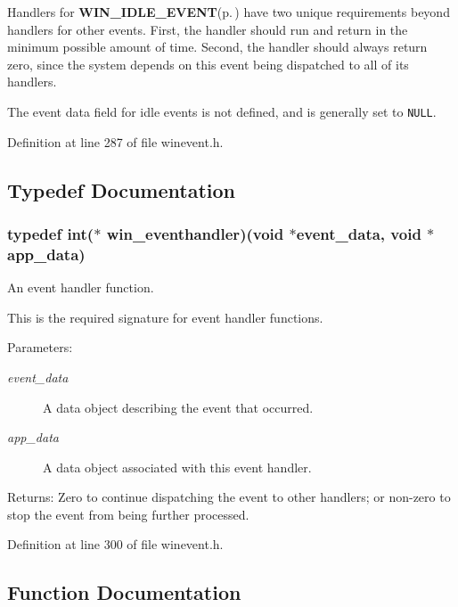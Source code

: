 Handlers for {\bf WIN\_\-IDLE\_\-EVENT}{\rm (p.\,\pageref{winevent_8h_a0})} have two unique requirements beyond handlers for other events. First, the handler should run and return in the minimum possible amount of time. Second, the handler should always return zero, since the system depends on this event being dispatched to all of its handlers.

The event data field for idle events is not defined, and is generally set to {\tt NULL}. 

Definition at line 287 of file winevent.h.

\subsection{Typedef Documentation}
\subsubsection{\setlength{\rightskip}{0pt plus 5cm}typedef int($\ast$ {\bf win\_\-eventhandler})(void $\ast$event\_\-data, void $\ast$app\_\-data)}\label{winevent_8h_a1}


An event handler function. 

This is the required signature for event handler functions.

\begin{Desc}
\item[Parameters:]
\begin{description}
\item[{\em event\_\-data}]A data object describing the event that occurred. \item[{\em app\_\-data}]A data object associated with this event handler.\end{description}
\end{Desc}
\begin{Desc}
\item[Returns:]Zero to continue dispatching the event to other handlers; or non-zero to stop the event from being further processed. \end{Desc}


Definition at line 300 of file winevent.h.

\subsection{Function Documentation}
